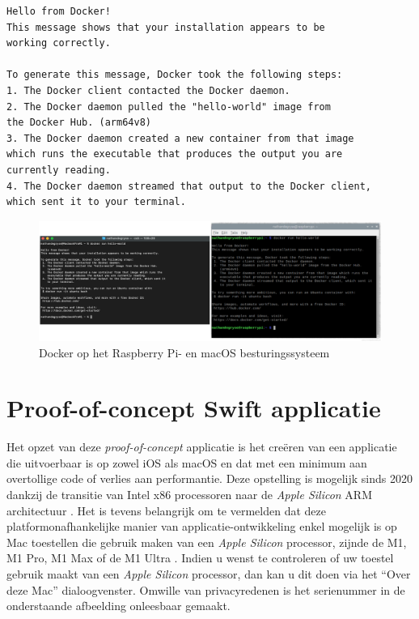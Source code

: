 \begin{lstlisting}
Hello from Docker!
This message shows that your installation appears to be 
working correctly.
	
To generate this message, Docker took the following steps:
1. The Docker client contacted the Docker daemon.
2. The Docker daemon pulled the "hello-world" image from 
the Docker Hub. (arm64v8)
3. The Docker daemon created a new container from that image 
which runs the executable that produces the output you are 
currently reading.
4. The Docker daemon streamed that output to the Docker client,
which sent it to your terminal.
\end{lstlisting}

\begin{figure}[!h]
	\centering
	\includegraphics[width=\linewidth]{img/docker.png}
	\caption{Docker op het Raspberry Pi- en macOS besturingssysteem}
\end{figure}

\pagebreak
\section{Proof-of-concept Swift applicatie}
Het opzet van deze \textit{proof-of-concept} applicatie is het creëren van een applicatie die uitvoerbaar is op zowel iOS als macOS en dat met een minimum aan overtollige code of verlies aan performantie. Deze opstelling is mogelijk sinds 2020 dankzij de transitie van Intel x86 processoren naar de \textit{Apple Silicon} ARM architectuur \autocite{Apple2020}. Het is tevens belangrijk om te vermelden dat deze platformonafhankelijke manier van applicatie-ontwikkeling enkel mogelijk is op Mac toestellen die gebruik maken van een \textit{Apple Silicon} processor, zijnde de M1, M1 Pro, M1 Max of de M1 Ultra \autocite{AppleDeveloper2022a}. Indien u wenst te controleren of uw toestel gebruik maakt van een \textit{Apple Silicon} processor, dan kan u dit doen via het “Over deze Mac” dialoogvenster. Omwille van privacyredenen is het serienummer in de onderstaande afbeelding onleesbaar gemaakt.

